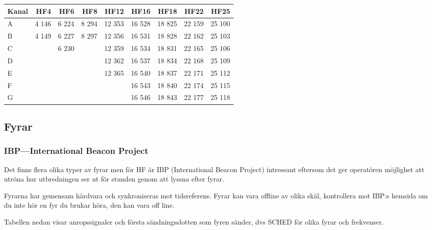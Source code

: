 \begin{longtable}{lrrrrrrrr}
\textbf{Kanal} & \textbf{HF4} & \textbf{HF6} & \textbf{HF8} & \textbf{HF12} & \textbf{HF16} & \textbf{HF18} & \textbf{HF22} & \textbf{HF25} \\
\hline
\endhead

A & 4 146 & 6 224 & 8 294 & 12 353 & 16 528 & 18 825 & 22 159 & 25 100 \\
B & 4 149 & 6 227 & 8 297 & 12 356 & 16 531 & 18 828 & 22 162 & 25 103 \\
C &       & 6 230 &       & 12 359 & 16 534 & 18 831 & 22 165 & 25 106 \\
D &       &       &       & 12 362 & 16 537 & 18 834 & 22 168 & 25 109 \\
E &       &       &       & 12 365 & 16 540 & 18 837 & 22 171 & 25 112 \\
F &       &       &       &        & 16 543 & 18 840 & 22 174 & 25 115 \\
G &       &       &       &        & 16 546 & 18 843 & 22 177 & 25 118 \\
\end{longtable}

\subsection{Fyrar}

\subsubsection{IBP---International Beacon Project}

Det finns flera olika typer av fyrar men för HF är IBP (International Beacon Project) intressant eftersom det ger operatören möjlighet att utröna hur utbredningen ser ut för stunden genom att lyssna efter fyrar. 

Fyrarna har gemensam hårdvara och synkroniseras mot tidsreferens. Fyrar kan vara offline av olika skäl, kontrollera mot IBP:s hemsida om du inte hör en fyr du brukar höra, den kan vara off line.

Tabellen nedan visar anropssignaler och första sändningsslotten som fyren sänder, dvs SCHED för olika fyrar och frekvenser.

